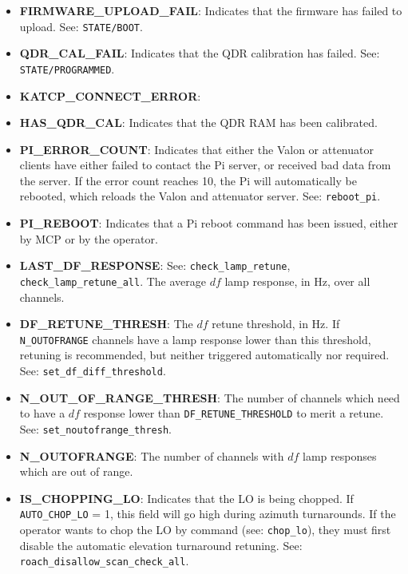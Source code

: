 \begin{itemize}[leftmargin=*,label={}]
\item \textbf{FIRMWARE\_UPLOAD\_FAIL}: Indicates that the firmware has failed to upload. See: \texttt{STATE/BOOT}.

\item \textbf{QDR\_CAL\_FAIL}: Indicates that the QDR calibration has failed. See: \texttt{STATE/PROGRAMMED}.

\item \textbf{KATCP\_CONNECT\_ERROR}:

\item \textbf{HAS\_QDR\_CAL}: Indicates that the QDR RAM has been calibrated.

\item \textbf{PI\_ERROR\_COUNT}: Indicates that either the Valon or attenuator
 clients have either failed to contact the Pi server, or received bad data from the server. If the error count reaches 10, the Pi will automatically be rebooted, which reloads the Valon and attenuator server. See: \texttt{reboot\_pi}.

\item \textbf{PI\_REBOOT}: Indicates that a Pi reboot command has been issued, either by MCP or by the operator.

\item \textbf{LAST\_DF\_RESPONSE}: See: \texttt{check\_lamp\_retune}, \texttt{check\_lamp\_retune\_all}. The average $df$ lamp response, in Hz, over all channels.

\item \textbf{DF\_RETUNE\_THRESH}: The $df$ retune threshold, in Hz. If \texttt{N\_OUTOFRANGE} channels have a lamp response lower than this threshold, retuning is recommended, but neither triggered automatically nor required. See: \texttt{set\_df\_diff\_threshold}.

\item \textbf{N\_OUT\_OF\_RANGE\_THRESH}: The number of channels which need to have a $df$ response lower than \texttt{DF\_RETUNE\_THRESHOLD} to merit a retune.
See: \texttt{set\_noutofrange\_thresh}.

\item \textbf{N\_OUTOFRANGE}: The number of channels with $df$ lamp responses which are out of range.

\item \textbf{IS\_CHOPPING\_LO}: Indicates that the LO is being chopped. If \texttt{AUTO\_CHOP\_LO} = 1, this field will go high during azimuth turnarounds. If the operator wants to chop the LO by command (see: \texttt{chop\_lo}), they must first disable the automatic elevation turnaround retuning. See: \texttt{roach\_disallow\_scan\_check\_all}.


\end{itemize}
